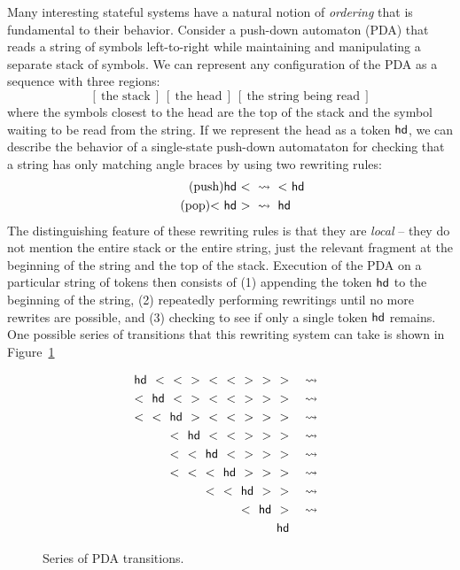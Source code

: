 Many interesting stateful systems have a natural notion of {\it
  ordering} that is fundamental to their behavior. Consider a
push-down automaton (PDA) that reads a string of symbols left-to-right
while maintaining and manipulating a separate stack of symbols. We can
represent any configuration of the PDA as a sequence 
with three regions:
\[
[~\mbox{the stack}~]
~
[~\mbox{the head}~]
~
[~\mbox{the string being read}~]
\]
where the symbols closest to the head are the top of the stack and the
symbol waiting to be read from the string. If we represent the head as
a token ${\sf hd}$, we can describe the behavior of a single-state
push-down automataton for checking that a string has only matching 
angle braces by using two rewriting rules:
\begin{align}
\tag{push} {\sf hd}~{<} ~&\rightsquigarrow~ {<}~{\sf hd}
\\
\tag{pop} {<}~{\sf hd}~{>} ~&\rightsquigarrow~ {\sf hd}
\end{align}
The distinguishing feature of these rewriting rules is that they are
{\it local} -- they do not mention the entire stack or the entire
string, just the relevant fragment at the beginning of the string and
the top of the stack. Execution of the PDA on a particular string of
tokens then consists of (1) appending the token ${\sf hd}$ to the
beginning of the string, (2) repeatedly performing rewritings until no
more rewrites are possible, and (3) checking to see if only a single
token ${\sf hd}$ remains. One possible series of transitions that this
rewriting system can take is shown in Figure~\ref{fig:pda-transitions}

\begin{figure}
\begin{align*}
{\sf hd}~~{<}~~{<}~~{>}~~{<}~~{<}~~{>}~~{>}~~{>}
& ~~~\rightsquigarrow~~\\
{<}~~{\sf hd}~~{<}~~{>}~~{<}~~{<}~~{>}~~{>}~~{>}
& ~~~\rightsquigarrow~~\\
{<}~~{<}~~{\sf hd}~~{>}~~{<}~~{<}~~{>}~~{>}~~{>}
& ~~~\rightsquigarrow~~\\
{<}~~{\sf hd}~~{<}~~{<}~~{>}~~{>}~~{>}
& ~~~\rightsquigarrow~~\\
{<}~~{<}~~{\sf hd}~~{<}~~{>}~~{>}~~{>}
& ~~~\rightsquigarrow~~\\
{<}~~{<}~~{<}~~{\sf hd}~~{>}~~{>}~~{>}
& ~~~\rightsquigarrow~~\\
{<}~~{<}~~{\sf hd}~~{>}~~{>}
& ~~~\rightsquigarrow~~\\
{<}~~{\sf hd}~~{>}
& ~~~\rightsquigarrow~~\\
{\sf hd} &
\end{align*}
\caption{Series of PDA transitions.}
\label{fig:pda-transitions}
\end{figure}

